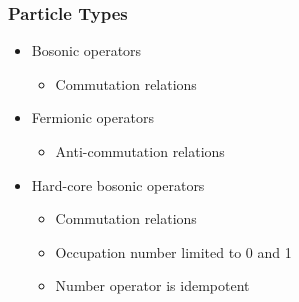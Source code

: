     \begin{frame}[t]
        \frametitle{Particle Types}
        
        \vspace{-0.4cm}

        \begin{minipage}[t]{0.5\textwidth}
            \vspace{0pt}
            \begin{itemize}
                \item Bosonic operators
                \begin{itemize}
                    \item Commutation relations
                \end{itemize}
                \item Fermionic operators
                \begin{itemize}
                    \item Anti-commutation relations
                \end{itemize}
                \item Hard-core bosonic operators \pause
                \begin{itemize}
                    \item Commutation relations \pause
                    \item Occupation number limited to 0 and 1  \pause
                    \item Number operator is idempotent
                \end{itemize}
            \end{itemize}
        \end{minipage}%
        \onslide
        \hfill
        \begin{minipage}[t]{0.45\textwidth}
            \vspace{0pt}
        \end{minipage}


\end{frame}
